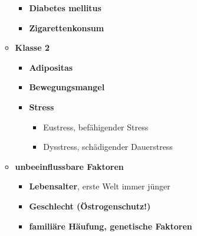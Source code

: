 \begin{itemize}
\begin{itemize}
\begin{itemize}
						\item \textbf{Diabetes mellitus}
						\item \textbf{Zigarettenkonsum}
					\end{itemize}
				\item \textbf{Klasse 2}
					\begin{itemize}
						\item \textbf{Adipositas}
						\item \textbf{Bewegungsmangel}
						\item \textbf{Stress}
							\begin{itemize}
								\item Eustress, befähigender Stress
								\item Dysstress, schädigender Dauerstress
							\end{itemize}
					\end{itemize}
				\item \textbf{unbeeinflussbare Faktoren}
					\begin{itemize}
						\item \textbf{Lebensalter}, erste Welt immer jünger
						\item \textbf{Geschlecht (Östrogenschutz!)}
						\item \textbf{familiäre Häufung, genetische Faktoren}
					\end{itemize}
			\end{itemize}
		\end{itemize}
			
